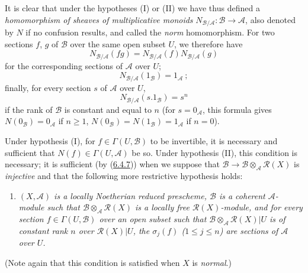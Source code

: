 \begin{env}[6.5.1]
It is clear that under the hypotheses (I) or (II) we have thus defined a
\emph{homomorphism of sheaves of multiplicative monoids}
$N_{\mathcal{B}/\mathcal{A}}:\mathcal{B}\to\mathcal{A}$, also denoted by $N$
if no confusion results, and called the \emph{norm} homomorphism. For two
sections $f$, $g$ of $\mathcal{B}$ over the same open subset $U$, we
therefore have
\[
\label{II.6.5.1.1}
N_{\mathcal{B}/\mathcal{A}}(fg)
=N_{\mathcal{B}/\mathcal{A}}(f)N_{\mathcal{B}/\mathcal{A}}(g)
\tag{6.5.1.1}
\]
for the corresponding sections of $\mathcal{A}$ over $U$;
\[
\label{II.6.5.1.2}
N_{\mathcal{B}/\mathcal{A}}(1_{\mathcal{B}})=1_{\mathcal{A}}~;
\tag{6.5.1.2}
\]
finally, for every section $s$ of $\mathcal{A}$ over $U$,
\[
\label{II.6.5.1.3}
N_{\mathcal{B}/\mathcal{A}}(s.1_{\mathcal{B}})=s^n
\tag{6.5.1.3}
\]
if the rank of $\mathcal{B}$ is constant and equal to $n$ (for
$s=0_{\mathcal{A}}$, this formula gives
$N(0_{\mathcal{B}})=0_{\mathcal{A}}$ if $n\geq1$,
$N(0_{\mathcal{B}})=N(1_{\mathcal{B}})=1_{\mathcal{A}}$ if $n=0$).

Under hypothesis (I), for $f\in\Gamma(U,\mathcal{B})$ to be invertible, it
is necessary and sufficient that $N(f)\in\Gamma(U,\mathcal{A})$ be so. Under
hypothesis (II), this condition is necessary; it is sufficient (by
(\hyperref[II.6.4.7]{6.4.7})) when we suppose that
$\mathcal{B}\to\mathcal{B}\otimes_{\mathcal{A}}\mathcal{R}(X)$ is
\emph{injective} and that the following more restrictive hypothesis holds:
\begin{enumerate}
\item[(II \emph{bis})] \emph{$(X,\mathcal{A})$ is a locally Noetherian
reduced prescheme, $\mathcal{B}$ is a coherent $\mathcal{A}$-module such that
$\mathcal{B}\otimes_{\mathcal{A}}\mathcal{R}(X)$ is a locally free
$\mathcal{R}(X)$-module, and for every section
$f\in\Gamma(U,\mathcal{B})$ over an open subset such that
$\mathcal{B}\otimes_{\mathcal{A}}\mathcal{R}(X)|U$ is of constant rank $n$
over $\mathcal{R}(X)|U$, the $\sigma_j(f)$ ($1\leq j\leq n$) are sections of
$\mathcal{A}$ over $U$.}
\end{enumerate}
(Note again that this condition is satisfied when $X$ is
\emph{normal}.)
\end{env}

